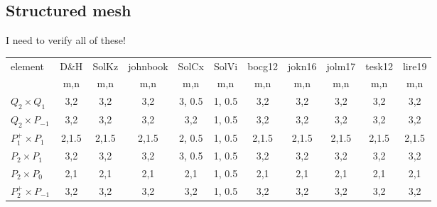 \subsection*{Structured mesh}

{\color{red} I need to verify all of these!}

\begin{scriptsize}
\begin{center}
\begin{tabular}{|l|c|c|c|c|c|c|c|c|c|c|}
\hline
element & D\&H  & SolKz &  johnbook  & SolCx &  SolVi & bocg12& 
jokn16 & jolm17 & tesk12 & lire19 \\
& m,n&  m,n&  m,n&  m,n&  m,n&  m,n&  m,n&  m,n& m,n& m,n\\
\hline
$Q_2\times Q_1$     & 
{\color{teal} 3,2}  & 
{\color{teal} 3,2}  & 
{\color{teal} 3,2}  & 
3, 0.5   & 
1, 0.5 & 
{\color{teal} 3,2}  & 
{\color{teal} 3,2}  &
{\color{teal} 3,2}  &
{\color{teal} 3,2}  &
{\color{teal} 3,2} \\ 
$Q_2\times P_{-1}$ & 
{\color{teal}3,2}  & 
{\color{teal}3,2}  & 
{\color{teal}3,2}  & 
{\color{teal}3,2}  & 
1, 0.5 & 
{\color{teal}3,2}  & 
{\color{teal}3,2}  &
{\color{teal}3,2}  &
{\color{teal}3,2}  & 
{\color{teal}3,2}  \\ 
$P_1^+\times P_{1}$   & 
{\color{teal} 2,1.5}  & 
{\color{teal} 2,1.5}  & 
{\color{teal} 2,1.5}  & 
2, 0.5 & 
1, 0.5 & 
{\color{teal} 2,1.5}  & 
{\color{teal} 2,1.5}  & 
{\color{teal} 2,1.5}  & 
{\color{teal} 2,1.5}  & 
{\color{teal} 2,1.5}  \\ 
$P_2\times P_1$     & 
{\color{teal}3,2}   & 
{\color{teal}3,2}   & 
{\color{teal}3,2}   & 
3, 0.5   & 
1, 0.5 & 
{\color{teal}3,2}   & 
{\color{teal}3,2}   & 
{\color{teal}3,2}   & 
{\color{teal}3,2}   & 
{\color{teal}3,2}   \\ 
$P_2\times P_0$     & 
{\color{teal}2,1}   & 
{\color{teal}2,1}   & 
{\color{teal}2,1}   & 
{\color{teal}2,1}   & 
1, 0.5 & 
{\color{teal}2,1}   & 
{\color{teal}2,1}   & 
{\color{teal}2,1}   & 
{\color{teal}2,1}   & 
{\color{teal}2,1}   \\ 
$P_2^+\times P_{-1}$  & 
{\color{teal}3,2}     & 
{\color{teal}3,2}     & 
{\color{teal}3,2}     & 
{\color{teal}3,2}     & 
1, 0.5 & 
{\color{teal}3,2}     & 
{\color{teal}3,2}     & 
{\color{teal}3,2}     & 
{\color{teal}3,2}     & 
{\color{teal}3,2}     \\ 
\hline
\end{tabular}
\end{center}
\end{scriptsize}

